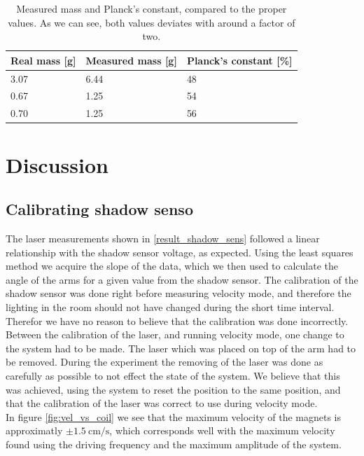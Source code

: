 \documentclass[english,a4paper,12pt,reprint]{revtex4-1}
\begin{document}
\begin{table}[]
\centering
\caption{Measured mass and Planck's constant, compared to the proper values. As we can see, both values deviates with around a factor of two.}
\label{final_result}
\begin{tabular}{@{}lll@{}}
\toprule
Real mass {[}g{]} & Measured mass {[}g{]} & Planck's constant {[}\%{]} \\ \midrule
3.07              & 6.44                  & 48                                   \\
0.67              & 1.25                  & 54                                   \\
0.70              & 1.25                  & 56                                   \\ \bottomrule
\end{tabular}
\end{table}

\section{Discussion}
\subsection{Calibrating shadow senso}
The laser measurements shown in \vref{result_shadow_sens} followed a linear relationship with the shadow sensor voltage, as expected. Using the least squares method \cite{squires} we acquire the slope of the data, which we then used to calculate the angle of the arms for a given value from the shadow sensor. The calibration of the shadow sensor was done right before measuring velocity mode, and therefore the lighting in the room should not have changed during the short time interval. Therefor we have no reason to believe that the calibration was done incorrectly.\\
Between the calibration of the laser, and running velocity mode, one change to the system had to be made. The laser which was placed on top of the arm had to be removed. During the experiment the removing of the laser was done as carefully as possible to not effect the state of the system. We believe that this was achieved, using the system to reset the position to the same position, and that the calibration of the laser was correct to use during velocity mode. \\
In figure \vref{fig:vel_vs_coil} we see that the maximum velocity of the magnets is approximatly $\pm\SI{1.5}{\centi\meter/\second}$, which corresponds well with the maximum velocity found using the driving frequency and the maximum amplitude of the system.
\end{document}
